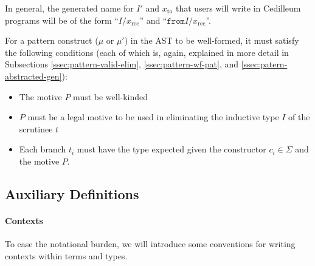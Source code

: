 \documentclass{article}
\begin{document}
\noindent In general, the generated name for $I'$ and $x_{\text{to}}$ that users
will write in Cedilleum programs will be of the form ``$I\texttt{/}x_{\text{rec}}$''
and ``$\texttt{from}I\texttt{/}x_{\text{rec}}$''.

For a pattern construct ($\mu$ or $\mu'$) in the AST to be well-formed, it must satisfy the
following conditions (each of which is, again, explained in more detail in
Subsections \ref{ssec:pattern-valid-elim}, \ref{ssec:pattern-wf-pat}, and
\ref{ssec:patern-abstracted-gen}):

\begin{itemize}
\item The motive $P$ must be well-kinded
\item $P$ must be a legal motive to be used in eliminating the inductive type
  $I$ of the scrutinee $t$
\item Each branch $t_i$ must have the type expected given the constructor $c_i
  \in \Sigma$ and the motive $P$.
\end{itemize}

\subsection{Auxiliary Definitions}
\label{ssec:inductive-aux-defs}

\paragraph{Contexts}
To ease the notational burden, we will introduce some conventions for writing
contexts within terms and types.
\end{document}
